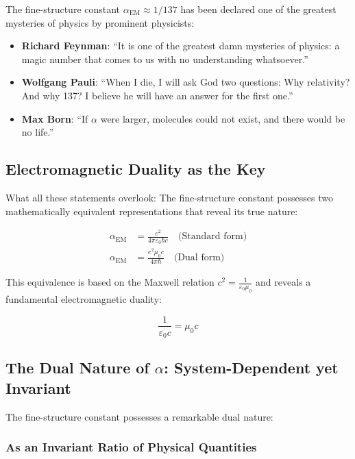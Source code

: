 \documentclass[12pt,a4paper]{article}
\begin{document}
The fine-structure constant $\alpha_{\text{EM}} \approx 1/137$ has been declared one of the greatest mysteries of physics by prominent physicists:

\begin{itemize}
	\item \textbf{Richard Feynman}: ``It is one of the greatest damn mysteries of physics: a magic number that comes to us with no understanding whatsoever.''
	\item \textbf{Wolfgang Pauli}: ``When I die, I will ask God two questions: Why relativity? And why 137? I believe he will have an answer for the first one.''
	\item \textbf{Max Born}: ``If $\alpha$ were larger, molecules could not exist, and there would be no life.''
\end{itemize}

\subsection{Electromagnetic Duality as the Key}
\label{subsec:electromagnetic_duality}

What all these statements overlook: The fine-structure constant possesses two mathematically equivalent representations that reveal its true nature:

\begin{align}
	\alpha_{\text{EM}} &= \frac{e^2}{4\pi\varepsilon_0\hbar c} \quad \text{(Standard form)} \label{eq:alpha_standard}\\
	\alpha_{\text{EM}} &= \frac{e^2 \mu_0 c}{4\pi \hbar} \quad \text{(Dual form)} \label{eq:alpha_dual}
\end{align}

This equivalence is based on the Maxwell relation $c^2 = \frac{1}{\varepsilon_0\mu_0}$ and reveals a fundamental electromagnetic duality:

\begin{equation}
	\frac{1}{\varepsilon_0 c} = \mu_0 c
	\label{eq:em_duality}
\end{equation}

\subsection{The Dual Nature of $\alpha$: System-Dependent yet Invariant}
\label{subsec:double_nature}

The fine-structure constant possesses a remarkable dual nature:

\subsubsection{As an Invariant Ratio of Physical Quantities}
\label{subsubsec:invariant_ratio}
\end{document}
